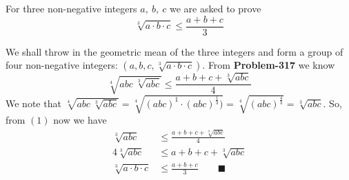 \documentclass{article}
\begin{document}
For three non-negative integers $a,\ b,\ c$ we are asked to prove
\[
	\sqrt[3]{a \cdot b \cdot c} \leq \frac{a+b+c}{3}
\]

We shall throw in the geometric mean of the three integers and form a group of four non-negative integers: $(a,b,c,\sqrt[3]{a \cdot b \cdot c})$. From \textbf{Problem-317} we know
\setcounter{equation}{0}
\begin{equation}
	\sqrt[4]{ abc\ \sqrt[3]{abc} } \leq \frac{a+b+c+\sqrt[3]{abc}}{4}
\end{equation}
We note that $\sqrt[4]{ abc\ \sqrt[3]{abc} } = \sqrt[4]{ (abc)^1 \cdot (abc)^{\frac{1}{3}}) } = \sqrt[4]{ (abc)^{\frac{4}{3}} } = \sqrt[3]{abc}$. So, from $(1)$ now we have
\begin{equation*}
	\begin{aligned}
		\sqrt[3]{abc} &\leq \frac{a+b+c+\sqrt[3]{abc}}{4}\\
		4\sqrt[3]{abc} &\leq a+b+c+\sqrt[3]{abc}\\
		\sqrt[3]{a \cdot b \cdot c} &\leq \frac{a+b+c}{3}\ \ \ \ \ \ \ \ \ \blacksquare
	\end{aligned}
\end{equation*}
\end{document}
